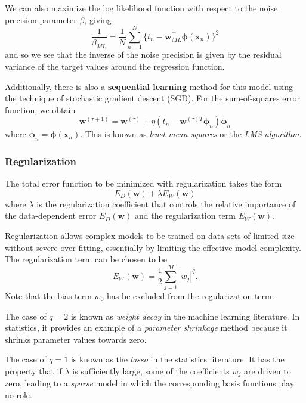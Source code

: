 \documentclass[a4paper]{report}
\renewcommand{\bf}{\mathbf}
\newcommand{\imp}[1]{{\color{blue}\textit{#1}}}
\newcommand{\bs}{\boldsymbol}
\begin{document}
We can also maximize the log likelihood function with respect to the noise precision parameter $\beta$, giving
\begin{equation}
	\frac{1}{\beta_{ML}} = \frac{1}{N} \sum_{n=1}^N \{ t_n - \bf{w}_{ML}^{\intercal} \bs{\phi}(\bf{x}_n) \}^2
\end{equation}
and so we see that the inverse of the noise precision is given by the residual variance of the target values around the regression function.

Additionally, there is also a \textbf{sequential learning} method for this model using the technique of stochastic gradient descent (SGD). For the sum-of-squares error function, we obtain
\begin{equation}
	\bf{w}^{(\tau+1)} = \bf{w}^{(\tau)} + \eta (t_n - \bf{w}^{(\tau)T} \bs{\phi}_n) \bs{\phi}_n
\end{equation}
where $\bs{\phi}_n = \bs{\phi}(\bf{x}_n)$. This is known as \imp{least-mean-squares} or the \imp{LMS algorithm}.
\subsubsection{Regularization}
The total error function to be minimized with regularization takes the form
\begin{equation}
	E_D(\bf{w}) + \lambda E_W(\bf{w})
\end{equation}
where $\lambda$ is the regularization coefficient that controls the relative importance of the data-dependent error $E_D(\bf{w})$ and the regularization term $E_W(\bf{w})$.

Regularization allows complex models to be trained on data sets of limited size without severe over-fitting, essentially by limiting the effective model complexity. The regularization term can be chosen to be
\begin{equation}
	E_W(\bf{w}) = \frac{1}{2} \sum_{j=1}^M |w_j|^q.
\end{equation}
Note that the bias term $w_0$ has be excluded from the regularization term.

The case of $q = 2$ is known as \imp{weight decay} in the machine learning literature. In statistics, it provides an example of a \imp{parameter shrinkage} method because it shrinks parameter values towards zero.

The case of $q = 1$ is known as the \imp{lasso} in the statistics literature. It has the property that if $\lambda$ is sufficiently large, some of the coefficients $w_j$ are driven to zero, leading to a \imp{sparse} model in which the corresponding basis functions play no role.
\end{document}
